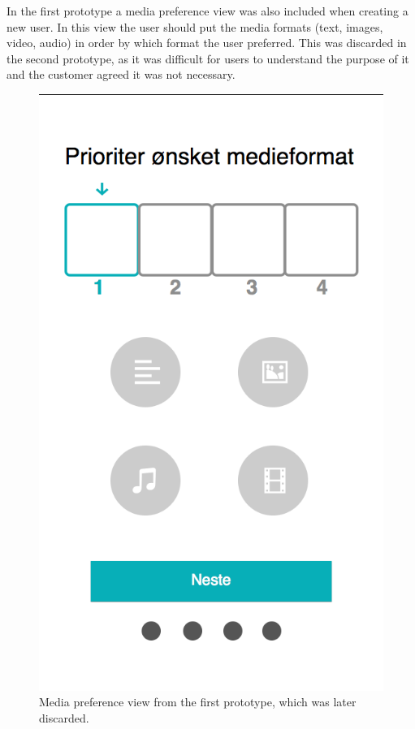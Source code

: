 In the first prototype a media preference view was also included when creating a new user. In this view the user should put the media formats (text, images, video, audio) in order by which format the user preferred. This was discarded in the second prototype, as it was difficult for users to understand the purpose of it and the customer agreed it was not necessary. 
\begin{figure}[h]
	\centering
	\includegraphics[scale=0.5]{fig/prototype_media}
	\caption{Media preference view from the first prototype, which was later discarded.}	
\end{figure}



